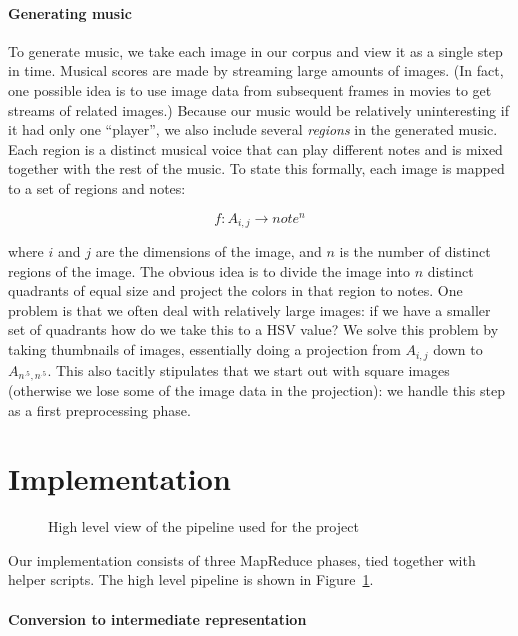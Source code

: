\documentclass[10pt, conference, compsocconf]{IEEEtran}
\begin{document}
{\paragraph{Generating music}

To generate music, we take each image in our corpus and view it as a
single step in time.  Musical scores are made by streaming large
amounts of images.  (In fact, one possible idea is to use image data
from subsequent frames in movies to get streams of related images.)
Because our music would be relatively uninteresting if it had only one
``player'', we also include several \emph{regions} in the generated
music.  Each region is a distinct musical voice that can play
different notes and is mixed together with the rest of the music.  To
state this formally, each image is mapped to a set of regions and
notes:

\[
    f : A_{i,j} \to note^n
\]

where $i$ and $j$ are the dimensions of the image, and $n$ is the
number of distinct regions of the image.  The obvious idea is to
divide the image into $n$ distinct quadrants of equal size and project
the colors in that region to notes.  One problem is that we often deal
with relatively large images: if we have a smaller set of quadrants
how do we take this to a HSV value?  We solve this problem by taking
thumbnails of images, essentially doing a projection from $A_{i,j}$
down to $A_{n^{.5},n^{.5}}$.  This also tacitly stipulates that we
start out with square images (otherwise we lose some of the image data
in the projection): we handle this step as a first preprocessing
phase.

\section{Implementation}

\begin{figure}
  \centering
  \caption{High level view of the pipeline used for the project}
  \label{fig:project-pipeline}
\end{figure}

Our implementation consists of three MapReduce phases, tied together
with helper scripts.  The high level pipeline is shown in
Figure~\ref{fig:project-pipeline}.


\paragraph{Conversion to intermediate representation}
\label{sec:conversion}

}
\end{document}
